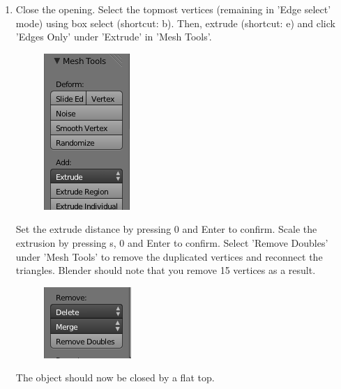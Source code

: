 \documentclass[twoside,a4paper]{refart}
\begin{document}
\begin{enumerate}
\item   Close the opening. Select the topmost vertices (remaining in 'Edge select' mode) using box select (shortcut: b). Then, extrude (shortcut: e) and click 'Edges Only' under 'Extrude' in 'Mesh Tools'.        
        \begin{figure}[H]
        \includegraphics[scale=0.5]{spinehead4.png}
        \end{figure}
        Set the extrude distance by pressing 0 and Enter to confirm. Scale the extrusion by pressing s, 0 and Enter to confirm. Select 'Remove Doubles' under 'Mesh Tools' to remove the duplicated vertices and reconnect the triangles. Blender should note that you remove 15 vertices as a result.
        \begin{figure}[H]
        \includegraphics[scale=0.5]{spinehead5.png}
        \end{figure}
        The object should now be closed by a flat top.


\end{enumerate}
\end{document}
